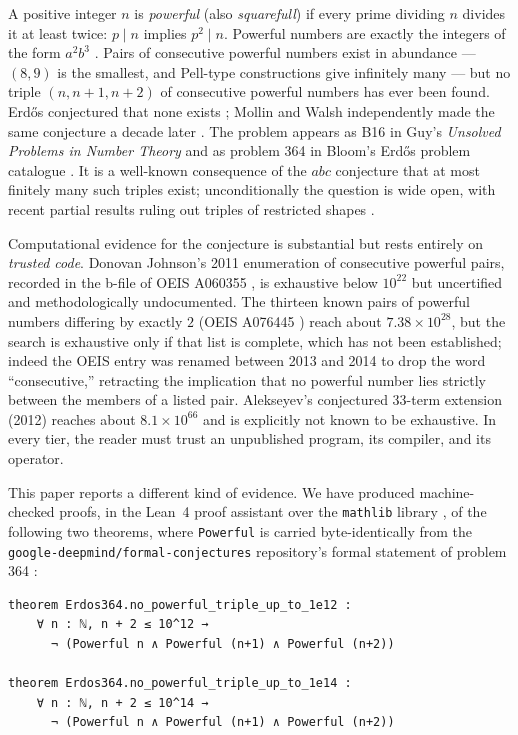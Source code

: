 \documentclass[11pt]{article}
\theoremstyle{definition}
\theoremstyle{remark}
\newcommand{\code}[1]{\texttt{#1}}
\newcommand{\Powerful}{\code{Powerful}}
\begin{document}
A positive integer $n$ is \emph{powerful} (also \emph{squarefull}) if
every prime dividing $n$ divides it at least twice: $p \mid n$ implies
$p^2 \mid n$. Powerful numbers are exactly the integers of the form
$a^2 b^3$ \cite{Golomb1970,OEISA001694}. Pairs of consecutive powerful numbers exist
in abundance --- $(8,9)$ is the smallest, and Pell-type constructions give
infinitely many --- but no triple $(n, n{+}1, n{+}2)$ of consecutive
powerful numbers has ever been found. Erd\H{o}s conjectured that none
exists \cite{Erdos1976}; Mollin and Walsh independently made the same
conjecture a decade later \cite{MollinWalsh1986}. The problem appears as
B16 in Guy's \emph{Unsolved Problems in Number Theory} \cite{GuyB16} and
as problem 364 in Bloom's Erd\H{o}s problem catalogue
\cite{ErdosProblems364}. It is a well-known consequence of the $abc$
conjecture that at most finitely many such triples exist; unconditionally
the question is wide open, with recent partial results ruling out triples
of restricted shapes \cite{Beckon2019,Chan2025,She2025}.

Computational evidence for the conjecture is substantial but rests
entirely on \emph{trusted code}. Donovan Johnson's 2011 enumeration of
consecutive powerful pairs, recorded in the b-file of OEIS A060355
\cite{OEISA060355}, is exhaustive below $10^{22}$ but uncertified and
methodologically undocumented. The thirteen known pairs of powerful
numbers differing by exactly $2$ (OEIS A076445
\cite{OEISA076445}) reach about $7.38 \times 10^{28}$, but the search is
exhaustive only if that list is complete, which has not been established;
indeed the OEIS entry was renamed between 2013 and 2014 to drop the word
``consecutive,'' retracting the implication that no powerful number lies
strictly between the members of a listed pair. Alekseyev's conjectured
33-term extension (2012) reaches about $8.1 \times 10^{66}$ and is
explicitly not known to be exhaustive. In every tier, the reader must
trust an unpublished program, its compiler, and its operator.

This paper reports a different kind of evidence. We have produced
machine-checked proofs, in the Lean~4 proof assistant \cite{Lean4} over
the \code{mathlib} library \cite{mathlib}, of the following two theorems,
where \Powerful{} is carried byte-identically from the
\code{google-deepmind/formal-conjectures} repository's formal statement of
problem 364 \cite{FormalConjectures}:

\begin{lstlisting}
theorem Erdos364.no_powerful_triple_up_to_1e12 :
    ∀ n : ℕ, n + 2 ≤ 10^12 →
      ¬ (Powerful n ∧ Powerful (n+1) ∧ Powerful (n+2))

theorem Erdos364.no_powerful_triple_up_to_1e14 :
    ∀ n : ℕ, n + 2 ≤ 10^14 →
      ¬ (Powerful n ∧ Powerful (n+1) ∧ Powerful (n+2))
\end{lstlisting}
\end{document}
